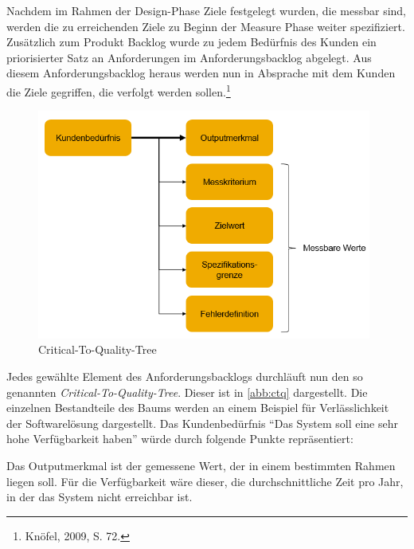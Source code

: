
        Nachdem im Rahmen der Design-Phase Ziele festgelegt wurden, die messbar sind, werden die zu erreichenden Ziele zu Beginn der Measure Phase weiter spezifiziert. Zusätzlich zum Produkt Backlog wurde zu jedem Bedürfnis des Kunden ein priorisierter Satz an Anforderungen im Anforderungsbacklog abgelegt. Aus diesem Anforderungsbacklog heraus werden nun in Absprache mit dem Kunden die Ziele gegriffen, die verfolgt werden sollen.\footnote{Knöfel, 2009, S. 72.}

        \begin{figure}[!htbp]%
            \begin{center}
                \includegraphics[width=11cm]{Abbildungen/ctq}
                \caption{Critical-To-Quality-Tree\protect\footnotemark}
                \label{abb:ctq}
            \end{center}
        \end{figure}


        Jedes gewählte Element des Anforderungsbacklogs durchläuft nun den so genannten \emph{Critical-To-Quality-Tree}. Dieser ist in \autoref{abb:ctq} dargestellt. Die einzelnen Bestandteile des Baums werden an einem Beispiel für Verlässlichkeit der Softwarelösung dargestellt. Das Kundenbedürfnis \enquote{Das System soll eine sehr hohe Verfügbarkeit haben} würde durch folgende Punkte repräsentiert:

        Das Outputmerkmal ist der gemessene Wert, der in einem bestimmten Rahmen liegen soll. Für die Verfügbarkeit wäre dieser, die durchschnittliche Zeit pro Jahr, in der das System nicht erreichbar ist.

